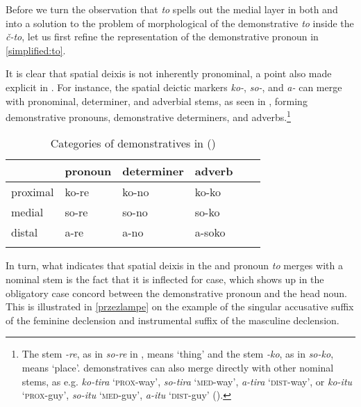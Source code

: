 \vskip 0.25cm
\noindent Before we turn the observation that \textit{to} spells out the medial layer in both  and  into a solution to the problem of morphological  of the demonstrative \textit{to} inside the  \textit{\v{c}-to}, let us first refine the representation of the demonstrative pronoun in \ref{simplified:to}.
\par
It is clear that spatial deixis is not inherently pronominal, a point also made explicit in \cite{Lander-Haegeman2016}. For instance, the  spatial deictic markers \textit{ko-}, \textit{so-}, and \textit{a-} can merge with pronominal, determiner, and adverbial stems, as seen in , forming demonstrative pronouns, demonstrative determiners, and  adverbs.\footnote{The stem \textit{-re}, as in \textit{so-re} in  , means `thing' and the stem \textit{-ko}, as in \textit{so-ko}, means `place'.  demonstratives can also merge directly with other nominal stems, as e.g. \textit{ko-tira} `\textsc{prox}-way', \textit{so-tira} `\textsc{med}-way', \textit{a-tira} `\textsc{dist}-way', or \textit{ko-itu} `\textsc{prox}-guy', \textit{so-itu} `\textsc{med}-guy', \textit{a-itu} `\textsc{dist}-guy' (\citealt[97]{Hoji-etal2003}). 
} %


\begin{table}
\caption{Categories of demonstratives in  (\citealt{Kuno1973})}
\label{Jap:stems} 
\begin{tabular}[h]{ l l l l l l }
\lsptoprule	
		& pronoun 	& determiner 	& adverb\\\midrule
proximal	& ko-re		& ko-no		& ko-ko\\
medial	& so-re		& so-no		& so-ko\\
distal		& a-re		& a-no		& a-soko\\
\lspbottomrule
\end{tabular}
\end{table}

\noindent In turn, what indicates that spatial deixis in the  and   pronoun \textit{to} merges with a nominal stem is the fact that it is inflected for case, which shows up in the obligatory case concord between the demonstrative pronoun and the head noun. This is illustrated in \ref{przezlampe} on the example of the  singular accusative suffix of the feminine declension and instrumental suffix of the masculine declension.

